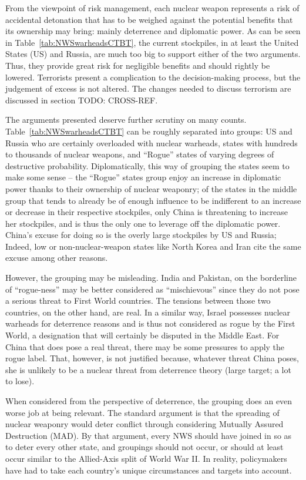 \documentclass[twoside,titlepage,11pt,twocolumn,a4paper]{article}
\begin{document}
From the viewpoint of risk management, each nuclear weapon represents
a risk of accidental detonation that has to be weighed against the
potential benefits that its ownership may bring: mainly deterrence and
diplomatic power. As can be seen in Table~\ref{tab:NWSwarheadsCTBT},
the current stockpiles, in at least the United States (US) and Russia,
are much too big to support either of the two arguments. Thus, they
provide great risk for negligible benefits and should rightly be
lowered. Terrorists present a complication to the decision-making
process, but the judgement of excess is not altered. The changes
needed to discuss terrorism are discussed in section TODO: CROSS-REF.

The arguments presented deserve further scrutiny on many
counts. Table~\ref{tab:NWSwarheadsCTBT} can be roughly separated into
groups: US and Russia who are certainly overloaded with nuclear
warheads, states with hundreds to thousands of nuclear weapons, and
``Rogue'' states of varying degrees of destructive
probability. Diplomatically, this way of grouping the states seem to
make some sense -- the ``Rogue'' states group enjoy an increase in
diplomatic power thanks to their ownership of nuclear weaponry; of the
states in the middle group that tends to already be of enough
influence to be indifferent to an increase or decrease in their
respective stockpiles, only China is threatening to increase her
stockpiles, and is thus the only one to leverage off the diplomatic
power. China's excuse for doing so is the overly large stockpiles by
US and Russia; Indeed, low or non-nuclear-weapon states like North
Korea and Iran cite the same excuse among other reasons. 

However, the grouping may be misleading. India and Pakistan, on the
borderline of ``rogue-ness'' may be better considered as
``mischievous'' since they do not pose a serious threat to First World
countries. The tensions between those two countries, on the other
hand, are real. In a similar way, Israel possesses nuclear warheads for
deterrence reasons and is thus not considered as rogue by the First
World, a designation that will certainly be disputed in the Middle
East. For China that does pose a real threat, there may be some
pressures to apply the rogue label. That, however, is not justified
because, whatever threat China poses, she is unlikely to be a nuclear
threat from deterrence theory (large target; a lot to lose).

When considered from the perspective of deterrence, the grouping does
an even worse job at being relevant. The standard argument is that the
spreading of nuclear weaponry would deter conflict through considering
Mutually Assured Destruction (MAD). By that argument, every NWS should
have joined in so as to deter every other state, and groupings should
not occur, or should at least occur similar to the Allied-Axis split
of World War II. In reality, policymakers have had to take each
country's unique circumstances and targets into account. 
\end{document}

